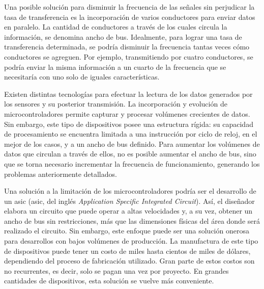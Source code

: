 Una posible solución para disminuir la frecuencia de las señales sin perjudicar la tasa de transferencia es la incorporación de varios conductores para enviar datos en paralelo.
La cantidad de conductores a través de los cuales circula la información, se denomina ancho de bus. Idealmente, para lograr una tasa de transferencia determinada, se podría disminuir la frecuencia tantas veces cómo conductores se agreguen. Por ejemplo, transmitiendo por cuatro conductores, se podría enviar la misma información a un cuarto de la frecuencia que se necesitaría con uno solo de iguales características.%

Existen distintas tecnologías para efectuar la lectura de los datos generados por los sensores y su posterior transmisión. La incorporación y evolución de microcontroladores permite capturar y procesar volúmenes crecientes de datos. Sin embargo, este tipo de dispositivos posee una estructura rígida: su capacidad de procesamiento se encuentra limitada a una instrucción por ciclo de reloj, en el mejor de los casos, y a un ancho de bus definido. Para aumentar los volúmenes de datos que circulan a través de ellos, no es posible aumentar el ancho de bus, sino que se torna necesario incrementar la frecuencia de funcionamiento, generando los problemas anteriormente detallados.%

Una solución a la limitación de los microcontroladores podría ser
el desarrollo de un \acrlong{asic} (\acrshort{asic}, del inglés {\it Application Specific Integrated Circuit}). Así, el diseñador elabora un circuito que puede operar a altas velocidades y, a su vez, obtener un ancho de bus sin restricciones, más que las dimensiones físicas del área donde será realizado el circuito. Sin embargo, este enfoque puede ser una solución onerosa para desarrollos con bajos volúmenes de producción. La manufactura de este tipo de dispositivos puede tener un costo de miles hasta cientos de miles de dólares, dependiendo del proceso de fabricación utilizado. Gran parte de estos costos son no recurrentes, es decir, solo se pagan una vez por proyecto. En grandes cantidades de dispositivos, esta solución se vuelve más conveniente.%

